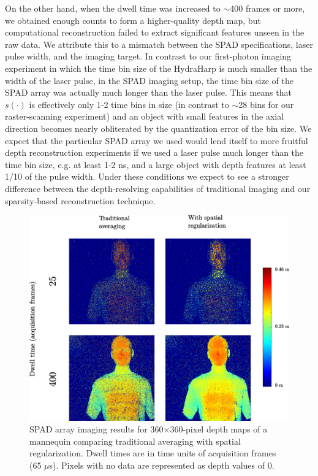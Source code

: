 On the other hand, when the dwell time was increased to $\sim$400 frames or more, we obtained enough counts to form a higher-quality depth map, but computational reconstruction failed to extract significant features unseen in the raw data. We attribute this to a mismatch between the SPAD specifications, laser pulse width, and the imaging target. In contrast to our first-photon imaging experiment in which the time bin size of the HydraHarp is much smaller than the width of the laser pulse, in the SPAD imaging setup, the time bin size of the SPAD array was actually much longer than the laser pulse. This means that $s(\cdot)$ is effectively only 1-2 time bins in size (in contrast to $\sim$28 bins for our raster-scanning experiment) and an object with small features in the axial direction becomes nearly obliterated by the quantization error of the bin size. We expect that the particular SPAD array we used would lend itself to more fruitful depth reconstruction experiments if we used a laser pulse much longer than the time bin size, e.g. at least 1-2 ns, and a large object with depth features at least 1/10 of the pulse width. Under these conditions we expect to see a stronger difference between the depth-resolving capabilities of traditional imaging and our sparsity-based reconstruction technique.

\begin{figure}[h!]
\centerline{\includegraphics[width=15cm]{figure-first-spad-mannequin-d.pdf}}
\caption{SPAD array imaging results for 360$\times$360-pixel depth maps of a mannequin comparing traditional averaging with spatial regularization. Dwell times are in time units of acquisition frames (65 $\mu$s). Pixels with no data are represented as depth values of $0$.}
\label{figure:first-spad-mannequin-d}
\end{figure}

